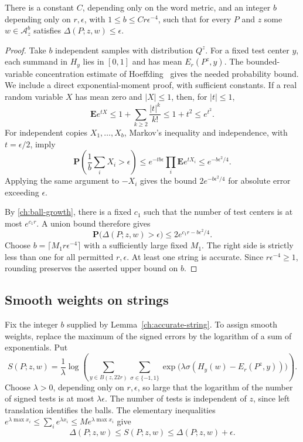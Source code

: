 \begin{lemma}
\label{ch:accurate-string}
There is a constant $C$, depending only on the word metric, and an integer
$b$ depending only on $r,\epsilon$, with
$1\le b\le Cr\epsilon^{-4}$, such that for every $P$ and $z$ some
$w\in\mathcal A_z^b$ satisfies $\Delta(P;z,w)\le\epsilon$.
\end{lemma}

\begin{proof}
Take $b$ independent samples with distribution $Q^z$.  For a fixed test
center $y$, each summand in $H_y$ lies in $[0,1]$ and has mean
$E_r(P^z,y)$.  The bounded-variable concentration estimate of
Hoeffding~\cite{Hoeffding1963} gives the needed probability bound.  We
include a direct exponential-moment proof, with sufficient constants.
If a real random variable $X$ has mean zero and $|X|\le1$, then, for
$|t|\le1$,
\[
 \mathbf E e^{tX}
 \le1+\sum_{k\ge2}\frac{|t|^k}{k!}
 \le1+t^2\le e^{t^2}.
\]
For independent copies $X_1,\ldots,X_b$, Markov's inequality and
independence, with $t=\epsilon/2$, imply
\[
 \mathbf P\!\left(\frac1b\sum_iX_i>\epsilon\right)
 \le e^{-tb\epsilon}\prod_i\mathbf E e^{tX_i}
 \le e^{-b\epsilon^2/4}.
\]
Applying the same argument to $-X_i$ gives the bound
$2e^{-b\epsilon^2/4}$ for absolute error exceeding $\epsilon$.

By \eqref{ch:ball-growth}, there is a fixed $c_1$ such that the number of
test centers is at most $e^{c_1r}$.  A union bound therefore gives
\[
 \mathbf P\bigl(\Delta(P;z,w)>\epsilon\bigr)
 \le2e^{c_1r-b\epsilon^2/4}.
\]
Choose $b=\lceil M_1r\epsilon^{-4}\rceil$ with a sufficiently large
fixed $M_1$.  The right side is strictly less than one for all permitted
$r,\epsilon$.  At least one string is accurate.  Since
$r\epsilon^{-4}\ge1$, rounding preserves the asserted upper bound on $b$.
\end{proof}

\subsection{Smooth weights on strings}

Fix the integer $b$ supplied by Lemma~\ref{ch:accurate-string}.  To assign
smooth weights, replace the maximum of the signed errors by the logarithm
of a sum of exponentials.  Put
\begin{equation}
 S(P;z,w)=\frac1\lambda\log
 \left(\sum_{y\in B(z,22r)}\sum_{\sigma\in\{-1,1\}}
   \exp\bigl(\lambda\sigma(H_y(w)-E_r(P^z,y))\bigr)\right).
 \label{ch:smooth-discrepancy}
\end{equation}
Choose $\lambda>0$, depending only on $r,\epsilon$, so large that the
logarithm of the number of signed tests is at most $\lambda\epsilon$.
The number of tests is independent of $z$, since left translation identifies
the balls.  The elementary inequalities
$e^{\lambda\max x_i}\le\sum_i e^{\lambda x_i}
\le M e^{\lambda\max x_i}$ give
\begin{equation}
 \Delta(P;z,w)\le S(P;z,w)\le\Delta(P;z,w)+\epsilon.
 \label{ch:smoothing-error}
\end{equation}

